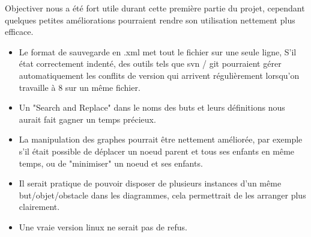 Objectiver nous a été fort utile durant cette première partie du projet,
cependant quelques petites améliorations pourraient rendre son utilisation
nettement plus efficace.

\begin{itemize}
	\item Le format de sauvegarde en .xml met tout le fichier sur une seule
	ligne, S'il état correctement indenté, des outils tels que svn / git
	pourraient gérer automatiquement les conflits de version qui arrivent
	régulièrement lorsqu'on travaille à 8 sur un même fichier.
	
	\item Un "Search and Replace" dans le noms des buts et leurs définitions
	nous aurait fait gagner un temps précieux. 

	\item La manipulation des graphes pourrait être nettement améliorée,
	par exemple s'il était possible de déplacer un noeud parent et tous ses
	enfants en même temps, ou de "minimiser" un noeud et ses enfants. 

	\item Il serait pratique de pouvoir disposer de plusieurs instances d'un
	même but/objet/obstacle dans les diagrammes, cela permettrait de les 
	arranger plus clairement.

	\item Une vraie version linux ne serait pas de refus.
\end{itemize}



